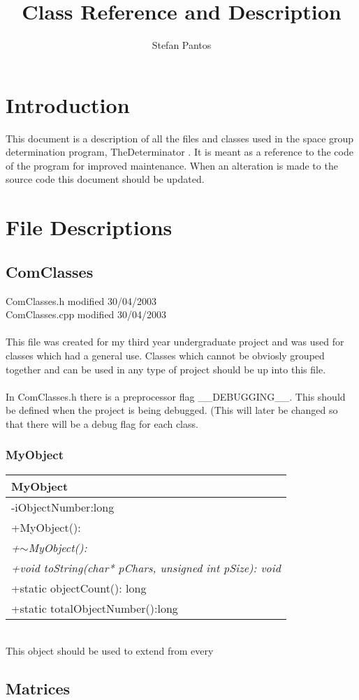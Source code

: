 \documentclass[11pt]{article}
\title{Class Reference and Description}
\author{Stefan Pantos}
\begin{document}
\maketitle
\section{Introduction}
This document is a description of all the files and classes used in the space group determination program, TheDeterminator . It is meant as a reference to the code of the program for improved maintenance. When an alteration is made to the source code this document should be updated.
\section{File Descriptions}
\subsection{ComClasses}
{\footnotesize ComClasses.h modified  30/04/2003 \\ ComClasses.cpp modified 30/04/2003}\\\\
This file was created for my third year undergraduate project and was used for classes which had a general use. Classes which cannot be obviosly grouped together and can be used in any type of project should be up into this file.\\\\
In ComClasses.h there is a preprocessor flag __DEBUGGING__. This should be defined when the project is being debugged. (This will later be changed so that there will be a debug flag for each class.
\subsubsection{MyObject}
\begin{table}[h]
\begin{tabular}{|l|}\hline
\textbf{MyObject}\\ \hline
-iObjectNumber:long\\
\hline
+MyObject():\\
\textit{+$\sim$MyObject():}\\
\textit{+void toString(char* pChars, unsigned int pSize): void}\\
+static objectCount(): long\\
+static totalObjectNumber():long\\
\hline
\end{tabular}
\label{default}
\end{table}\\
This object should be used to extend from every

\subsection{Matrices}

 
\end{document}
